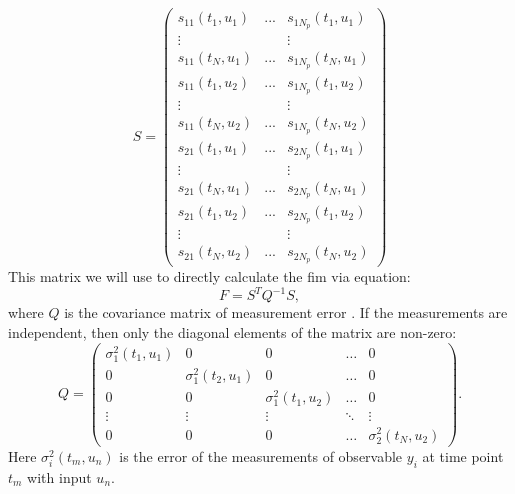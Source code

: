 \documentclass[10pt,A4paper]{article}
\begin{document}
\begin{equation}
    S = 
\begin{pmatrix}
s_{11} (t_1, u_1) & ... & s_{1 N_p}(t_1, u_1) \\
\vdots  &   & \vdots  \\
s_{11} (t_{N}, u_1) & ... & s_{1 N_p} (t_{N}, u_1)\\
s_{11} (t_1, u_2) & ... & s_{1 N_p}(t_1, u_2) \\
\vdots  &   & \vdots  \\
s_{11} (t_N, u_2) & ... & s_{1 N_p} (t_N, u_2)\\

s_{21} (t_1, u_1) & ... & s_{2 N_p}(t_1, u_1) \\
\vdots  &   & \vdots  \\
s_{21} (t_{N}, u_1) & ... & s_{2 N_p} (t_{N}, u_1)\\
s_{21} (t_1, u_2) & ... & s_{2 N_p}(t_1, u_2) \\
\vdots  &   & \vdots  \\
s_{21} (t_N, u_2) & ... & s_{2 N_p} (t_N, u_2)
\end{pmatrix}
\label{eq:sens_matrix}
\end{equation}
This matrix we will use to directly calculate the \ac{fim} via equation:
\begin{equation}
    F = S^T Q^{-1} S,
\end{equation}
where $Q$ is the covariance matrix of measurement error \cite{}. 
If the measurements are independent, then only the diagonal elements of the matrix are non-zero: 
\begin{equation}
    Q = 
\begin{pmatrix}
    \sigma_{1}^2(t_1, u_1) & 0                      & 0                      & \dots  & 0                     \\
    0                      & \sigma_{1}^2(t_2, u_1) & 0                      & \dots  & 0                     \\
    0                      & 0                      & \sigma_{1}^2(t_1, u_2) & \dots  & 0                     \\
    \vdots                 & \vdots                 & \vdots                 & \ddots & \vdots                \\
    0                      & 0                      & 0                      & \dots  & \sigma_{2}^2(t_N, u_2)
\end{pmatrix}.
\label{eq:covar_matrix}
\end{equation}
Here $\sigma_{i}^2 (t_m, u_n)$ is the error of the measurements of observable $y_i$ at time point $t_m$ with input $u_n$.
\end{document}
